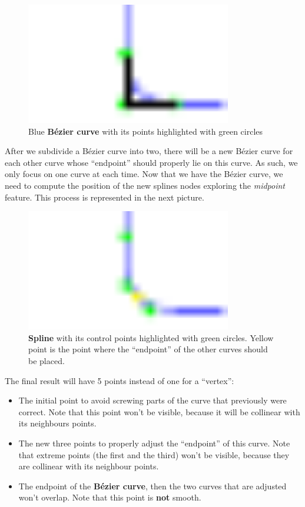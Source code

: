 \begin{figure}[H]
  \centering
  \includegraphics[width=0.8\textwidth]{assets/subdivision2.pdf}
  \caption{Blue \textbf{Bézier curve} with its points highlighted with green
    circles}
\end{figure}

After we subdivide a Bézier curve into two, there will be a new Bézier curve for
each other curve whose ``endpoint'' should properly lie on this curve. As such,
we only focus on one curve at each time. Now that we have the Bézier curve, we
need to compute the position of the new splines nodes exploring the
\emph{midpoint} feature. This process is represented in the next picture.

\begin{figure}[H]
  \centering
  \includegraphics[width=0.8\textwidth]{assets/subdivision3.pdf}
  \caption{\textbf{Spline} with its control points highlighted with green
    circles. Yellow point is the point where the ``endpoint'' of the other
    curves should be placed.}
\end{figure}

The final result will have 5 points instead of one for a ``vertex'':

\begin{itemize}
\item The initial point to avoid screwing parts of the curve that previously
  were correct. Note that this point won't be visible, because it will be
  collinear with its neighbours points.
\item The new three points to properly adjust the ``endpoint'' of this curve.
  Note that extreme points (the first and the third) won't be visible, because
  they are collinear with its neighbour points.
\item The endpoint of the \textbf{Bézier curve}, then the two curves that are
  adjusted won't overlap. Note that this point is \textbf{not} smooth.
\end{itemize}

